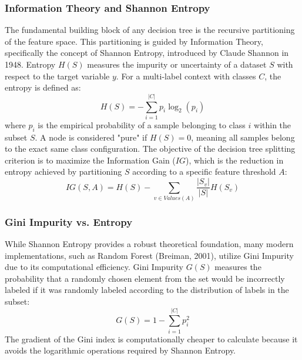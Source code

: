 \subsubsection{Information Theory and Shannon Entropy}
The fundamental building block of any decision tree is the recursive partitioning of the feature space. This partitioning is guided by Information Theory, specifically the concept of Shannon Entropy, introduced by Claude Shannon in 1948. Entropy $H(S)$ measures the impurity or uncertainty of a dataset $S$ with respect to the target variable $y$. For a multi-label \parencite{tsoumakas2007multi} context with classes $C$, the entropy is defined as:
\begin{equation}
    H(S) = - \sum_{i=1}^{|C|} p_i \log_2 (p_i)
\end{equation}
where $p_i$ is the empirical probability of a sample belonging to class $i$ within the subset $S$. A node is considered "pure" if $H(S) = 0$, meaning all samples belong to the exact same class configuration. The objective of the decision tree splitting criterion is to maximize the Information Gain ($IG$), which is the reduction in entropy achieved by partitioning $S$ according to a specific feature threshold $A$:
\begin{equation}
    IG(S, A) = H(S) - \sum_{v \in Values(A)} \frac{|S_v|}{|S|} H(S_v)
\end{equation}

\subsubsection{Gini Impurity vs. Entropy}
While Shannon Entropy provides a robust theoretical foundation, many modern implementations, such as Random Forest \parencite{breiman2001random} (Breiman, 2001), utilize Gini Impurity due to its computational efficiency. Gini Impurity $G(S)$ measures the probability that a randomly chosen element from the set would be incorrectly labeled if it was randomly labeled according to the distribution of labels in the subset:
\begin{equation}
    G(S) = 1 - \sum_{i=1}^{|C|} p_i^2
\end{equation}
The gradient of the Gini index is computationally cheaper to calculate because it avoids the logarithmic operations required by Shannon Entropy. 

